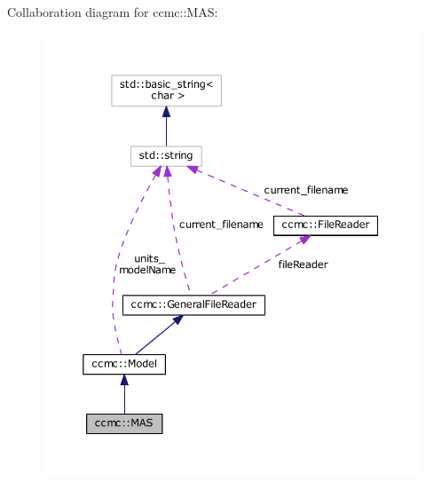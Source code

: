 Collaboration diagram for ccmc\-:\-:M\-A\-S\-:
\nopagebreak
\begin{figure}[H]
\begin{center}
\leavevmode
\includegraphics[width=350pt]{classccmc_1_1_m_a_s__coll__graph}
\end{center}
\end{figure}

